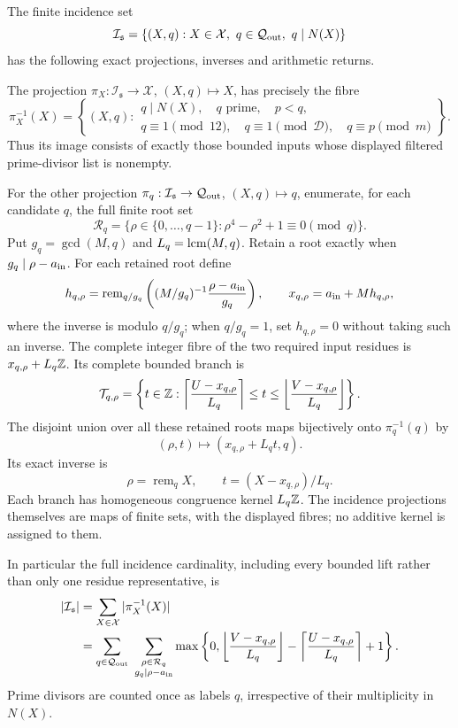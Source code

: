 \begin{theorem}
\label{thm:input-output-incidence}
The finite incidence set
\[
 \mathcal I_{\mathfrak s}=
 \{(X,q):X\in\mathcal X,\ q\in\mathcal Q_{\rm out},\ q\mid N(X)\}
\]
has the following exact projections, inverses and arithmetic returns.

The projection \(\pi_X:\mathcal I_{\mathfrak s}\to\mathcal X\),
\((X,q)\mapsto X\), has precisely the fibre
\[
 \pi_X^{-1}(X)=
 \left\{(X,q):
 \begin{array}{l}
 q\mid N(X),\quad q\text{ prime},\quad p<q,\\
 q\equiv1\pmod{12},\quad q\equiv1\pmod{\mathcal D},\quad
 q\equiv p\pmod m
 \end{array}\right\}.
\]
Thus its image consists of exactly those bounded inputs whose
displayed filtered prime-divisor list is nonempty.

For the other projection
\(\pi_q:\mathcal I_{\mathfrak s}\to\mathcal Q_{\rm out}\),
\((X,q)\mapsto q\), enumerate, for each candidate \(q\), the full
finite root set
\[
 \mathcal R_q=
 \{\rho\in\{0,\ldots,q-1\}:\rho^4-\rho^2+1\equiv0\pmod q\}.
\]
Put \(g_q=\gcd(M,q)\) and \(L_q=\operatorname{lcm}(M,q)\).
Retain a root exactly when \(g_q\mid\rho-a_{\rm in}\).
For each retained root define
\[
 h_{q,\rho}=
 \operatorname{rem}_{q/g_q}
 \left((M/g_q)^{-1}\frac{\rho-a_{\rm in}}{g_q}\right),\qquad
 x_{q,\rho}=a_{\rm in}+M h_{q,\rho},
\]
where the inverse is modulo \(q/g_q\); when \(q/g_q=1\),
set \(h_{q,\rho}=0\) without taking such an inverse.
The complete integer fibre of the two required input residues is
\(x_{q,\rho}+L_q\mathbb Z\).  Its complete bounded branch is
\begin{equation}\label{eq:incidence-root-branch}
 \mathcal T_{q,\rho}=
 \left\{t\in\mathbb Z:
    \left\lceil\frac{U-x_{q,\rho}}{L_q}\right\rceil
       \le t\le
    \left\lfloor\frac{V-x_{q,\rho}}{L_q}\right\rfloor\right\}.
\end{equation}
The disjoint union over all these retained roots maps bijectively
onto \(\pi_q^{-1}(q)\) by
\[
 (\rho,t)\longmapsto(x_{q,\rho}+L_qt,q).
\]
Its exact inverse is
\[
 \rho=\operatorname{rem}_q X,\qquad
 t=(X-x_{q,\rho})/L_q.
\]
Each branch has homogeneous congruence kernel \(L_q\mathbb Z\).
The incidence projections themselves are maps of finite sets,
with the displayed fibres; no additive kernel is assigned to them.

In particular the full incidence cardinality, including every
bounded lift rather than only one residue representative, is
\begin{align}
 |\mathcal I_{\mathfrak s}|
 &=\sum_{X\in\mathcal X}|\pi_X^{-1}(X)|\notag\\
 &=\sum_{q\in\mathcal Q_{\rm out}}
   \ \sum_{\substack{\rho\in\mathcal R_q\\
                         g_q\mid\rho-a_{\rm in}}}
   \max\left\{0,
       \left\lfloor\frac{V-x_{q,\rho}}{L_q}\right\rfloor
      -\left\lceil\frac{U-x_{q,\rho}}{L_q}\right\rceil+1\right\}.
       \label{eq:incidence-count}
\end{align}
Prime divisors are counted once as labels \(q\), irrespective of
their multiplicity in \(N(X)\).


\end{theorem}

